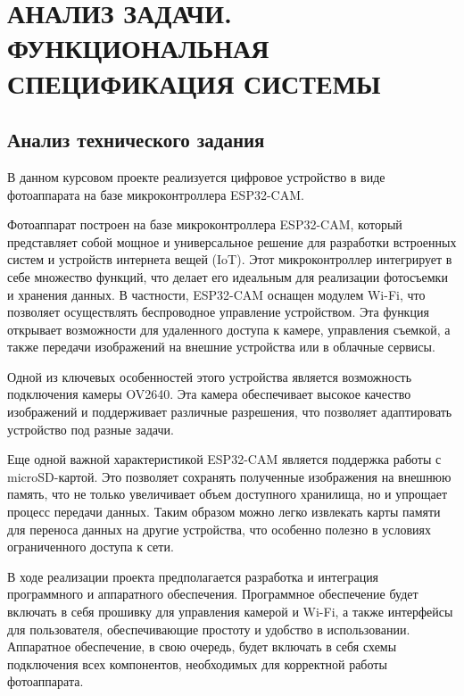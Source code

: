 \chapter[Анализ технического задания]
{АНАЛИЗ ЗАДАЧИ. ФУНКЦИОНАЛЬНАЯ СПЕЦИФИКАЦИЯ СИСТЕМЫ}

\section{Анализ технического задания}\par
\hspace*{12.5 mm}В данном курсовом проекте реализуется цифровое устройство в виде 
фотоаппарата на базе микроконтроллера ESP32-CAM.

Фотоаппарат построен на базе микроконтроллера ESP32-CAM, который 
представляет собой мощное и универсальное решение для разработки 
встроенных систем и устройств интернета вещей (IoT). Этот 
микроконтроллер интегрирует в себе множество функций, что делает его 
идеальным для реализации фотосъемки и хранения данных. В частности, 
ESP32-CAM оснащен модулем Wi-Fi, что позволяет осуществлять 
беспроводное управление устройством. Эта функция открывает 
возможности для удаленного доступа к камере, управления съемкой, а 
также передачи изображений на внешние устройства или в облачные 
сервисы.

Одной из ключевых особенностей этого устройства является возможность 
подключения камеры OV2640. Эта камера обеспечивает высокое качество 
изображений и поддерживает различные разрешения, что позволяет 
адаптировать устройство под разные задачи.

Еще одной важной характеристикой ESP32-CAM является поддержка работы 
с microSD-картой. Это позволяет сохранять полученные изображения на 
внешнюю память, что не только увеличивает объем доступного хранилища, 
но и упрощает процесс передачи данных. Таким образом можно 
легко извлекать карты памяти для переноса данных на другие 
устройства, что особенно полезно в условиях ограниченного доступа к 
сети.

В ходе реализации проекта предполагается разработка и интеграция 
программного и аппаратного обеспечения. Программное обеспечение 
будет включать в себя прошивку для управления камерой и Wi-Fi, а 
также интерфейсы для пользователя, обеспечивающие простоту и 
удобство в использовании. Аппаратное обеспечение, в свою очередь, 
будет включать в себя схемы подключения всех компонентов, 
необходимых для корректной работы фотоаппарата.

